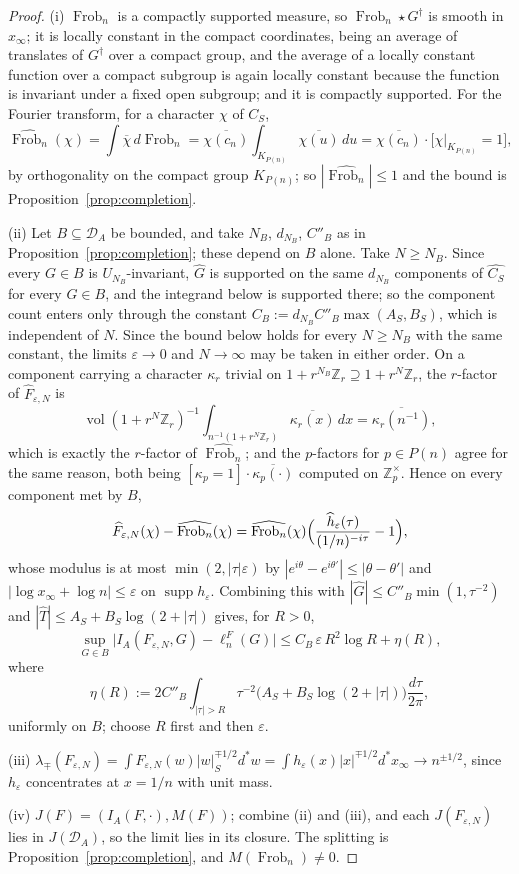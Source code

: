\documentclass[11pt]{amsart}
\theoremstyle{definition}
\theoremstyle{remark}
\newcommand{\Z}{\mathbb Z}
\newcommand{\Frob}{\operatorname{Frob}}
\newcommand{\supp}{\operatorname{supp}}
\newcommand{\vol}{\operatorname{vol}}
\newcommand{\DA}{\mathcal D_A}
\begin{document}
\begin{proof}
(i) $\Frob_n$ is a compactly supported measure, so $\Frob_n\star G^\dagger$ is
smooth in $x_\infty$; it is locally constant in the compact coordinates,
being an average of translates of $G^\dagger$ over a compact group, and the
average of a locally constant function over a compact subgroup is again locally
constant because the function is invariant under a fixed open subgroup; and it
is compactly supported. For the Fourier transform, for a character $\chi$ of
$C_S$,
\[
  \widehat{\Frob_n}(\chi)=\int\overline\chi\,d\Frob_n
   =\overline{\chi(c_n)}\int_{K_{P(n)}}\overline{\chi(u)}\,du
   =\overline{\chi(c_n)}\cdot\bigl[\chi|_{K_{P(n)}}=1\bigr],
\]
by orthogonality on the compact group $K_{P(n)}$; so $|\widehat{\Frob_n}|\le1$
and the bound is Proposition~\ref{prop:completion}.

(ii) Let $B\subseteq\DA$ be bounded, and take $N_B$, $d_{N_B}$, $C''_B$ as in
Proposition~\ref{prop:completion}; these depend on $B$ alone. Take $N\ge N_B$.
Since every $G\in B$ is $U_{N_B}$-invariant, $\widehat G$ is supported on the
same $d_{N_B}$ components of $\widehat{C_S}$ for every $G\in B$, and the
integrand below is supported there; so the component count enters only through
the constant $C_B:=d_{N_B}C''_B\max(A_S,B_S)$, which is independent of $N$.
Since the bound below holds for every $N\ge N_B$ with the same constant, the
limits $\varepsilon\to0$ and $N\to\infty$ may be taken in either order. On a component carrying a
character $\kappa_r$ trivial on $1+r^{N_B}\Z_r\supseteq1+r^N\Z_r$, the
$r$-factor of $\widehat F_{\varepsilon,N}$ is
\[
  \vol(1+r^N\Z_r)^{-1}\int_{n^{-1}(1+r^N\Z_r)}\overline{\kappa_r(x)}\,dx
   =\overline{\kappa_r(n^{-1})},
\]
which is exactly the $r$-factor of $\widehat{\Frob_n}$; and the $p$-factors for
$p\in P(n)$ agree for the same reason, both being
$[\kappa_p=1]\cdot\overline{\kappa_p(\cdot)}$ computed on $\Z_p^\times$. Hence
on every component met by $B$,
\[
  \widehat F_{\varepsilon,N}(\chi)-\widehat{\Frob_n}(\chi)
   =\widehat{\Frob_n}(\chi)\Bigl(\frac{\widehat h_\varepsilon(\tau)}
     {(1/n)^{-i\tau}}-1\Bigr),
\]
whose modulus is at most $\min(2,|\tau|\varepsilon)$ by
$|e^{i\theta}-e^{i\theta'}|\le|\theta-\theta'|$ and
$|\log x_\infty+\log n|\le\varepsilon$ on $\supp h_\varepsilon$. Combining this
with $|\widehat G|\le C''_B\min(1,\tau^{-2})$ and
$|\widehat T|\le A_S+B_S\log(2+|\tau|)$ gives, for $R>0$,
\[
  \sup_{G\in B}\bigl|I_A(F_{\varepsilon,N},G)-\ell_n^F(G)\bigr|
   \le C_B\,\varepsilon\,R^2\log R+\eta(R),
\]
where
\[
  \eta(R):=2C''_B\int_{|\tau|>R}\tau^{-2}
    \bigl(A_S+B_S\log(2+|\tau|)\bigr)\frac{d\tau}{2\pi},
\]
uniformly on $B$; choose $R$ first and then $\varepsilon$.

(iii) $\lambda_\mp(F_{\varepsilon,N})=\int F_{\varepsilon,N}(w)|w|_S^{\mp1/2}
d^*w=\int h_\varepsilon(x)|x|^{\mp1/2}d^*x_\infty\to n^{\pm1/2}$, since
$h_\varepsilon$ concentrates at $x=1/n$ with unit mass.

(iv) $J(F)=(I_A(F,\cdot),M(F))$; combine (ii) and (iii), and each
$J(F_{\varepsilon,N})$ lies in $J(\DA)$, so the limit lies in its closure. The
splitting is Proposition~\ref{prop:completion}, and $M(\Frob_n)\ne0$.
\end{proof}
\end{document}
